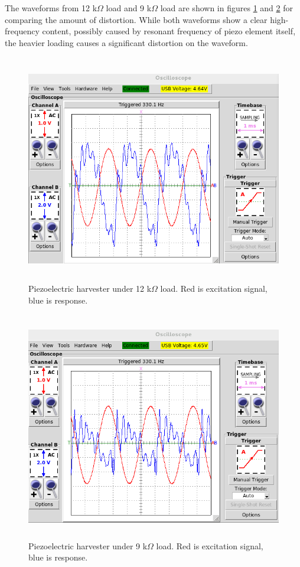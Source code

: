 The waveforms from 12 k$\Omega$ load and 9 k$\Omega$ load are shown in figures \ref{fig:piezo_td_12k} and \ref{fig:piezo_td_9k} for comparing the amount of distortion. While both waveforms show a clear high-frequency content, possibly caused by resonant frequency of piezo element itself, the heavier loading causes a significant distortion on the waveform.

\begin{figure}[htb]
\begin{center}
\includegraphics[height=10cm]{images/own_measurement/generator_shaker/piezo_td_12k_330hz_2_2.png}
\end{center}
\caption{\label{fig:piezo_td_12k} Piezoelectric harvester under 12 k$\Omega$ load. Red is excitation signal, blue is response.}
\end{figure}

\begin{figure}[htb]
\begin{center}
\includegraphics[height=10cm]{images/own_measurement/generator_shaker/piezo_td_9k_330hz_2_2.png}
\end{center}
\caption{\label{fig:piezo_td_9k} Piezoelectric harvester under 9 k$\Omega$ load. Red is excitation signal, blue is response.}
\end{figure}

